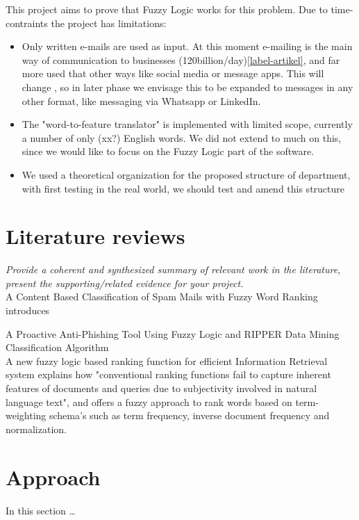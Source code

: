 \documentclass[a4paper]{article}
\begin{document}
This project aims to prove that Fuzzy Logic works for this problem. Due to time-contraints the project has limitations: 
\begin{itemize}
    \item Only written e-mails are used as input. At this moment e-mailing is the main way of communication to businesses (120billion/day)\ref{label-artikel}, and far more used that other ways like social media or message apps. This will change , so in later phase we envisage this to be expanded to messages in any other format, like messaging via Whatsapp or LinkedIn. 
    \item The "word-to-feature translator" is implemented with limited scope, currently a number of only (xx?) English words. We did not extend to much on this, since we would like to focus on the Fuzzy Logic part of the software.
    \item We used a theoretical organization for the proposed structure of department, with first testing in the real world, we should test and amend this structure 
\end{itemize}
\section{Literature reviews}

\textit{Provide a coherent and synthesized summary of relevant work in the
literature, present the supporting/related evidence for your project.} \\

A Content Based Classification of Spam Mails with Fuzzy Word Ranking
\cite{spam} introduces

A Proactive Anti-Phishing Tool Using Fuzzy Logic and RIPPER Data Mining Classification Algorithm \cite{phishing}\\

A new fuzzy logic based ranking function for efficient Information Retrieval system \cite{ranking} explains how "conventional ranking functions
fail to capture inherent features of documents and queries due to subjectivity
involved in natural language text", and offers a fuzzy approach to rank words
based on term-weighting schema's such as term frequency, inverse document
frequency and normalization.


\section{Approach}
In this section \dots
\end{document}
